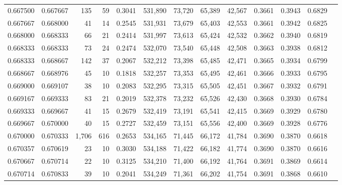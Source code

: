 \begin{tabular}{rrrrrrrrrrrrr}
0.667500 & 0.667667 &   135 &  59 &                                     0.3041 & 531,890 &  73,720 &  65,389 &  42,567 & 0.3661 & 0.3943 & 0.6829 \\
0.667667 & 0.668000 &    41 &  14 &                                     0.2545 & 531,931 &  73,679 &  65,403 &  42,553 & 0.3661 & 0.3942 & 0.6825 \\
0.668000 & 0.668333 &    66 &  21 &                                     0.2414 & 531,997 &  73,613 &  65,424 &  42,532 & 0.3662 & 0.3940 & 0.6819 \\
0.668333 & 0.668333 &    73 &  24 &                                     0.2474 & 532,070 &  73,540 &  65,448 &  42,508 & 0.3663 & 0.3938 & 0.6812 \\
0.668333 & 0.668667 &   142 &  37 &                                     0.2067 & 532,212 &  73,398 &  65,485 &  42,471 & 0.3665 & 0.3934 & 0.6799 \\
0.668667 & 0.668976 &    45 &  10 &                                     0.1818 & 532,257 &  73,353 &  65,495 &  42,461 & 0.3666 & 0.3933 & 0.6795 \\
0.669000 & 0.669107 &    38 &  10 &                                     0.2083 & 532,295 &  73,315 &  65,505 &  42,451 & 0.3667 & 0.3932 & 0.6791 \\
0.669167 & 0.669333 &    83 &  21 &                                     0.2019 & 532,378 &  73,232 &  65,526 &  42,430 & 0.3668 & 0.3930 & 0.6784 \\
0.669333 & 0.669667 &    41 &  15 &                                     0.2679 & 532,419 &  73,191 &  65,541 &  42,415 & 0.3669 & 0.3929 & 0.6780 \\
0.669667 & 0.670000 &    40 &  15 &                                     0.2727 & 532,459 &  73,151 &  65,556 &  42,400 & 0.3669 & 0.3928 & 0.6776 \\
0.670000 & 0.670333 & 1,706 & 616 &                                     0.2653 & 534,165 &  71,445 &  66,172 &  41,784 & 0.3690 & 0.3870 & 0.6618 \\
0.670357 & 0.670619 &    23 &  10 &                                     0.3030 & 534,188 &  71,422 &  66,182 &  41,774 & 0.3690 & 0.3870 & 0.6616 \\
0.670667 & 0.670714 &    22 &  10 &                                     0.3125 & 534,210 &  71,400 &  66,192 &  41,764 & 0.3691 & 0.3869 & 0.6614 \\
0.670714 & 0.670833 &    39 &  10 &                                     0.2041 & 534,249 &  71,361 &  66,202 &  41,754 & 0.3691 & 0.3868 & 0.6610 \\

\end{tabular}
